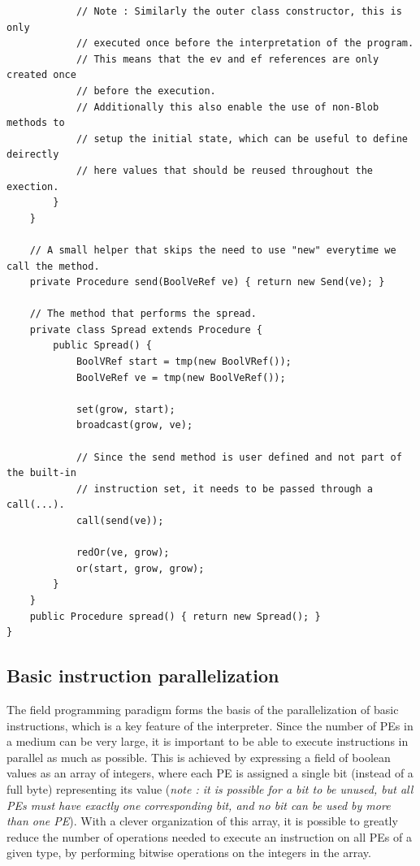 \documentclass[11pt,a4paper]{report}
\begin{document}
\begin{verbatim}
            // Note : Similarly the outer class constructor, this is only
            // executed once before the interpretation of the program.
            // This means that the ev and ef references are only created once
            // before the execution.
            // Additionally this also enable the use of non-Blob methods to
            // setup the initial state, which can be useful to define deirectly 
            // here values that should be reused throughout the exection.
        }
    }
    
    // A small helper that skips the need to use "new" everytime we call the method.
    private Procedure send(BoolVeRef ve) { return new Send(ve); }
    
    // The method that performs the spread.
    private class Spread extends Procedure {
        public Spread() {
            BoolVRef start = tmp(new BoolVRef());
            BoolVeRef ve = tmp(new BoolVeRef());
            
            set(grow, start);
            broadcast(grow, ve);
            
            // Since the send method is user defined and not part of the built-in
            // instruction set, it needs to be passed through a call(...).
            call(send(ve));
            
            redOr(ve, grow);
            or(start, grow, grow);
        }
    }
    public Procedure spread() { return new Spread(); }
}
\end{verbatim}

\subsection{Basic instruction parallelization}

The field programming paradigm forms the basis of the parallelization of basic instructions, which is a key feature of the interpreter. Since the number of PEs in a medium can be very large, it is important to be able to execute instructions in parallel as much as possible. This is achieved by expressing a field of boolean values as an array of integers, where each PE is assigned a single bit (instead of a full byte) representing its value (\textit{note : it is possible for a bit to be unused, but all PEs must have exactly one corresponding bit, and no bit can be used by more than one PE}). With a clever organization of this array, it is possible to greatly reduce the number of operations needed to execute an instruction on all PEs of a given type, by performing bitwise operations on the integers in the array.
\end{document}
